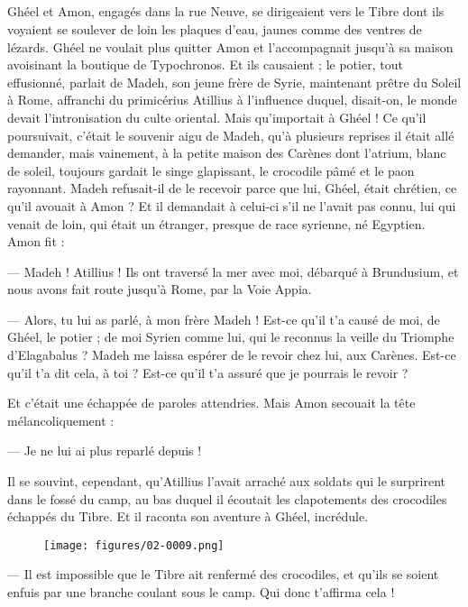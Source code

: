 \documentclass[a4paper, 11pt, oneside, polutonikogreek, french]{article}
\begin{document}
\subsection{}
\paragraph{}
Ghéel et Amon, engagés dans la rue Neuve, se dirigeaient vers le Tibre dont ils voyaient se soulever de loin les plaques d'eau, jaunes comme des ventres de lézards. Ghéel ne voulait plus quitter Amon et l'accompagnait jusqu'à sa maison avoisinant la boutique de Typochronos. Et ils causaient ; le potier, tout effusionné, parlait de Madeh, son jeune frère de Syrie, maintenant prêtre du Soleil à Rome, affranchi du primicérius Atillius à l'influence duquel, disait-on, le monde devait l'intronisation du culte oriental. Mais qu'importait à Ghéel ! Ce qu'il poursuivait, c'était le souvenir aigu de Madeh, qu'à plusieurs reprises il était allé demander, mais vainement, à la petite maison des Carènes dont l'atrium, blanc de soleil, toujours gardait le singe glapissant, le crocodile pâmé et le paon rayonnant. Madeh refusait-il de le recevoir parce que lui, Ghéel, était chrétien, ce qu'il avouait à Amon ? Et il demandait à celui-ci s'il ne l'avait pas connu, lui qui venait de loin, qui était un étranger, presque de race syrienne, né Egyptien. Amon fit :

--- Madeh ! Atillius ! Ils ont traversé la mer avec moi, débarqué à Brundusium, et nous avons fait route jusqu'à Rome, par la Voie Appia.

--- Alors, tu lui as parlé, à mon frère Madeh ! Est-ce qu'il t'a causé de moi, de Ghéel, le potier ; de moi Syrien comme lui, qui le reconnus la veille du Triomphe d'Elagabalus ? Madeh me laissa espérer de le revoir chez lui, aux Carènes. Est-ce qu'il t'a dit cela, à toi ? Est-ce qu'il t'a assuré que je pourrais le revoir ?

Et c'était une échappée de paroles attendries. Mais Amon secouait la tête mélancoliquement :

--- Je ne lui ai plus reparlé depuis !

Il se souvint, cependant, qu'Atillius l'avait arraché aux soldats qui le surprirent dans le fossé du camp, au bas duquel il écoutait les clapotements des crocodiles échappés du Tibre. Et il raconta son aventure à Ghéel, incrédule.
\begin{figure}[H]
\centering
\texttt{[image: figures/02-0009.png]}
\end{figure}
--- Il est impossible que le Tibre ait renfermé des crocodiles, et qu'ils se soient enfuis par une branche coulant sous le camp. Qui donc t'affirma cela !
\end{document}
